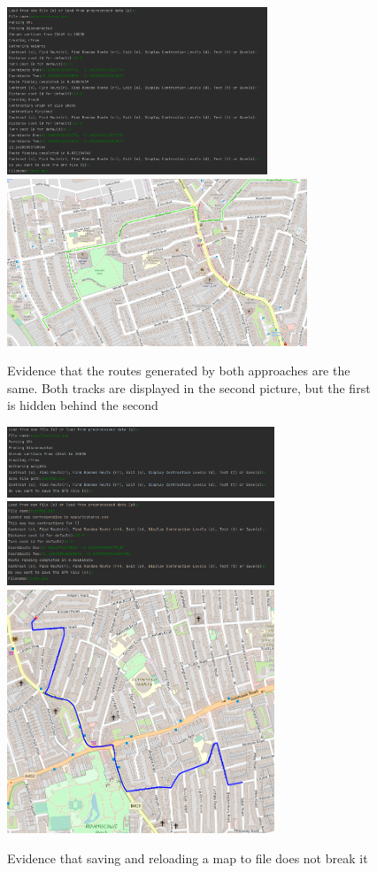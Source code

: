 \documentclass[11pt,twoside,a4paper]{report}
\begin{document}
\begin{figure}[h]
    \begin{center}
        \includegraphics[height=5cm]{checkContraction.png}\includegraphics[height=5cm]{overlap.png}
    \end{center}
    \caption{Evidence that the routes generated by both approaches are the same. Both tracks are displayed in the second picture, but the first is hidden behind the second}
    \label{contractoverlap}
\end{figure}
\begin{figure}[h]
    \begin{center}
        \includegraphics[width=8cm]{savemapone.png}\\
        \includegraphics[width=8cm]{savemaptwo.png}\\
        \includegraphics[width=8cm]{savemapthree.png}
    \end{center}
    \caption{Evidence that saving and reloading a map to file does not break it}
    \label{savemapevidence}
\end{figure}
\end{document}

